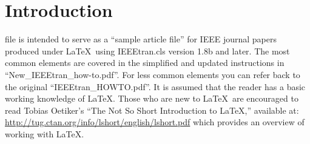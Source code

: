 
\section{Introduction}
 file is intended to serve as a ``sample article file''
for IEEE journal papers produced under \LaTeX\ using
IEEEtran.cls version 1.8b and later. The most common elements are covered in the simplified and updated instructions in ``New\_IEEEtran\_how-to.pdf''. For less common elements you can refer back to the original ``IEEEtran\_HOWTO.pdf''. It is assumed that the reader has a basic working knowledge of \LaTeX. Those who are new to \LaTeX \ are encouraged to read Tobias Oetiker's ``The Not So Short Introduction to \LaTeX ,'' available at: \url{http://tug.ctan.org/info/lshort/english/lshort.pdf} which provides an overview of working with \LaTeX.
